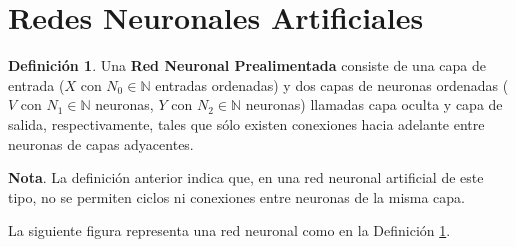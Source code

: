 \documentclass[11pt,letterpaper]{article}
\theoremstyle{definition}
\newtheorem{defi}{Definición}[section]%
\theoremstyle{definition}
\theoremstyle{definition}
\theoremstyle{definition}
\theoremstyle{definition}
\theoremstyle{definition}
\theoremstyle{definition}
\theoremstyle{definition}
\begin{document}
\section{Redes Neuronales Artificiales}
\begin{defi}\label{d1}
	Una \textbf{Red Neuronal Prealimentada} consiste de una capa de entrada ($ X $ con $ N_0 \in\mathbb{N}$ entradas ordenadas) y dos capas de neuronas ordenadas ($ V $ con $ N_1 \in\mathbb{N}$ neuronas, $ Y $ con $ N_2 \in\mathbb{N}$ neuronas) llamadas capa oculta y capa de salida, respectivamente, tales que sólo existen conexiones hacia adelante entre neuronas de capas adyacentes.
	
	\textbf{Nota}. La definición anterior indica que, en una red neuronal artificial de este tipo, no se permiten ciclos ni conexiones entre neuronas de la misma capa.
\end{defi}
\vspace{-.5em}
La siguiente figura representa una red neuronal como en la Definición \ref{d1}.
\end{document}
